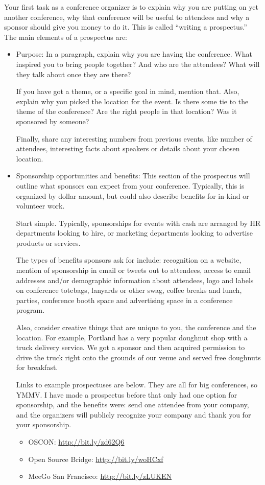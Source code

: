 Your first task as a conference organizer is to explain why you are putting on
yet another conference, why that conference will be useful to attendees and why
a sponsor should give you money to do it. This is called ``writing a
prospectus.''
The main elements of a prospectus are: 

\begin{itemize}
\item Purpose:
In a paragraph, explain why you are having the conference. What inspired you to
bring people together? And who are the attendees? What will they talk about once
they are there? 

If you have got a theme, or a specific goal in mind, mention that. Also, explain
why you picked the location for the event. Is there some tie to the theme of the
conference? Are the right people in that location? Was it sponsored by someone?

Finally, share any interesting numbers from previous events, like number of
attendees, interesting facts about speakers or details about your chosen
location. 

\item Sponsorship opportunities and benefits:
This section of the prospectus will outline what sponsors can expect from your
conference. Typically, this is organized by dollar amount, but could also
describe benefits for in-kind or volunteer work.

Start simple. Typically, sponsorships for events with cash are arranged by HR
departments looking to hire, or marketing departments looking to advertise
products or services. 

The types of benefits sponsors ask for include: recognition on a website,
mention of sponsorship in email or tweets out to attendees, access to email
addresses and/or demographic information about attendees, logo and labels on
conference totebags, lanyards or other swag, coffee breaks and lunch, parties,
conference booth space and advertising space in a conference program. 

Also, consider creative things that are unique to you, the conference and the
location. For example, Portland has a very popular doughnut shop with a truck
delivery service. We got a sponsor and then acquired permission to drive the
truck right onto the grounds of our venue and served free doughnuts for
breakfast.

Links to example prospectuses are below. They are all for big conferences, so
YMMV. I have made a prospectus before that
only had one option for sponsorship, and the benefits were: send one attendee
from your company, and the organizers will publicly recognize your company and 
thank you for your sponsorship.
\begin{itemize}
\item OSCON: \url{http://bit.ly/zd62Q6}
\item Open Source Bridge: \url{http://bit.ly/woHCxf}
\item MeeGo San Francisco: \url{http://bit.ly/zLUKEN}
\end{itemize}


\end{itemize}
